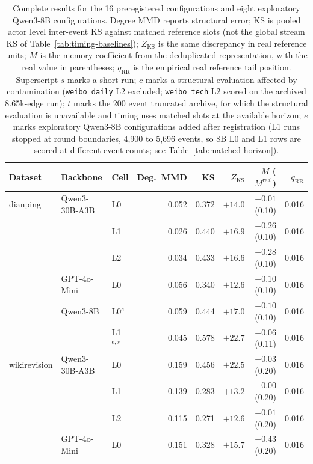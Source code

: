 \begin{table}[t]
\caption{Complete results for the 16 preregistered configurations and eight exploratory Qwen3-8B configurations. Degree MMD reports structural error; KS is pooled actor level inter-event KS against matched reference slots (not the global stream KS of Table~\ref{tab:timing-baselines}); $Z_{\mathrm{KS}}$ is the same discrepancy in real reference units; $M$ is the memory coefficient from the deduplicated representation, with the real value in parentheses; $q_{\mathrm{RR}}$ is the empirical real reference tail position. Superscript $s$ marks a short run; $c$ marks a structural evaluation affected by contamination (\texttt{weibo\_daily} L2 excluded; \texttt{weibo\_tech} L2 scored on the archived 8.65k-edge run); $t$ marks the 200 event truncated archive, for which the structural evaluation is unavailable and timing uses matched slots at the available horizon; $e$ marks exploratory Qwen3-8B configurations added after registration (L1 runs stopped at round boundaries, 4,900 to 5,696 events, so 8B L0 and L1 rows are scored at different event counts; see Table~\ref{tab:matched-horizon}).}
\label{tab:complete-configs}
\centering\scriptsize
\setlength{\tabcolsep}{4pt}\renewcommand{\arraystretch}{0.86}
\begin{tabular}{lllrrrrr}
\toprule
Dataset & Backbone & Cell & Deg.\ MMD & KS & $Z_{\mathrm{KS}}$ & $M$ ($M^{\mathrm{real}}$) & $q_{\mathrm{RR}}$ \\
\midrule
dianping & Qwen3-30B-A3B & L0 & 0.052 & 0.372 & $+14.0$ & $-0.01$ (0.10) & 0.016 \\
 &  & L1 & 0.026 & 0.440 & $+16.9$ & $-0.26$ (0.10) & 0.016 \\
 &  & L2 & 0.034 & 0.433 & $+16.6$ & $-0.28$ (0.10) & 0.016 \\
 & GPT-4o-Mini & L0 & 0.056 & 0.340 & $+12.6$ & $-0.10$ (0.10) & 0.016 \\
 & Qwen3-8B & L0$^{e}$ & 0.059 & 0.444 & $+17.0$ & $-0.10$ (0.10) & 0.016 \\
 &  & L1$^{e,s}$ & 0.045 & 0.578 & $+22.7$ & $-0.06$ (0.11) & 0.016 \\
wikirevision & Qwen3-30B-A3B & L0 & 0.159 & 0.456 & $+22.5$ & $+0.03$ (0.20) & 0.016 \\
 &  & L1 & 0.139 & 0.283 & $+13.2$ & $+0.00$ (0.20) & 0.016 \\
 &  & L2 & 0.115 & 0.271 & $+12.6$ & $-0.01$ (0.20) & 0.016 \\
 & GPT-4o-Mini & L0 & 0.151 & 0.328 & $+15.7$ & $+0.43$ (0.20) & 0.016 \\

\end{tabular}
\end{table}
